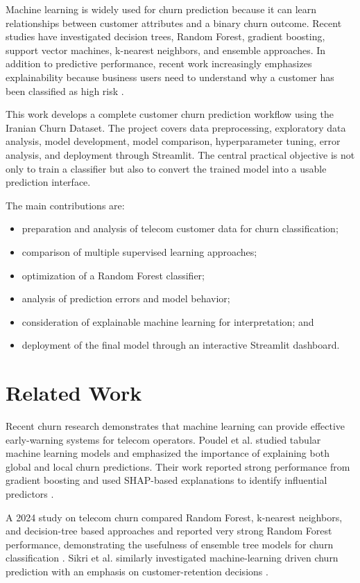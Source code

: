 \documentclass[conference]{IEEEtran}
\begin{document}
Machine learning is widely used for churn prediction because it can learn relationships between customer attributes and a binary churn outcome. Recent studies have investigated decision trees, Random Forest, gradient boosting, support vector machines, k-nearest neighbors, and ensemble approaches. In addition to predictive performance, recent work increasingly emphasizes explainability because business users need to understand why a customer has been classified as high risk \cite{poudel2024,atay2025,liu2025}.

This work develops a complete customer churn prediction workflow using the Iranian Churn Dataset. The project covers data preprocessing, exploratory data analysis, model development, model comparison, hyperparameter tuning, error analysis, and deployment through Streamlit. The central practical objective is not only to train a classifier but also to convert the trained model into a usable prediction interface.

The main contributions are:
\begin{itemize}
\item preparation and analysis of telecom customer data for churn classification;
\item comparison of multiple supervised learning approaches;
\item optimization of a Random Forest classifier;
\item analysis of prediction errors and model behavior;
\item consideration of explainable machine learning for interpretation; and
\item deployment of the final model through an interactive Streamlit dashboard.
\end{itemize}

\section{Related Work}
Recent churn research demonstrates that machine learning can provide effective early-warning systems for telecom operators. Poudel et al. studied tabular machine learning models and emphasized the importance of explaining both global and local churn predictions. Their work reported strong performance from gradient boosting and used SHAP-based explanations to identify influential predictors \cite{poudel2024}.

A 2024 study on telecom churn compared Random Forest, k-nearest neighbors, and decision-tree based approaches and reported very strong Random Forest performance, demonstrating the usefulness of ensemble tree models for churn classification \cite{telecom2024}. Sikri et al. similarly investigated machine-learning driven churn prediction with an emphasis on customer-retention decisions \cite{sikri2024}.
\end{document}

